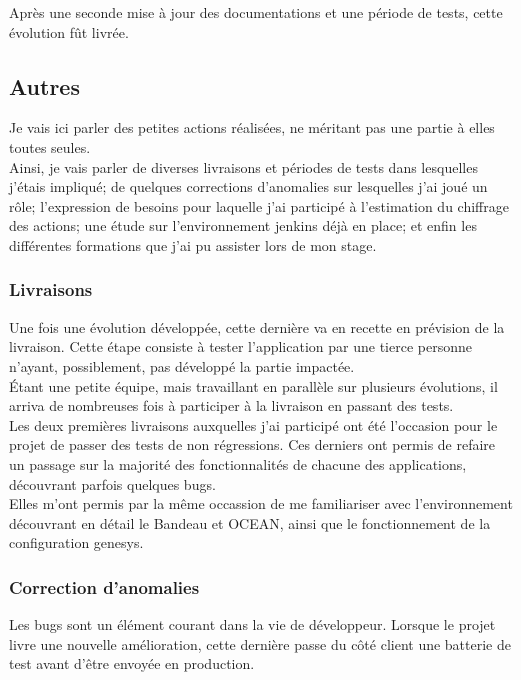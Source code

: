 \documentclass{rapport}
\begin{document}
Après une seconde mise à jour des documentations et une période de tests, cette évolution fût livrée.\\

\newpage
\subsection{Autres}
Je vais ici parler des petites actions réalisées, ne méritant pas une partie à elles toutes seules.\\
Ainsi, je vais parler de diverses livraisons et périodes de tests dans lesquelles j'étais impliqué; de quelques corrections d'anomalies sur lesquelles j'ai joué un rôle; l'expression de besoins pour laquelle j'ai participé à l'estimation du chiffrage des actions; une étude sur l'environnement jenkins déjà en place; et enfin les différentes formations que j'ai pu assister lors de mon stage.

\subsubsection{Livraisons}

Une fois une évolution développée, cette dernière va en recette en prévision de la livraison. Cette étape consiste à tester l'application par une tierce personne n'ayant, possiblement, pas développé la partie impactée.\\
Étant une petite équipe, mais travaillant en parallèle sur plusieurs évolutions, il arriva de nombreuses fois à participer à la livraison en passant des tests.\\

Les deux premières livraisons auxquelles j'ai participé ont été l'occasion pour le projet de passer des tests de non régressions. Ces derniers ont permis de refaire un passage sur la majorité des fonctionnalités de chacune des applications, découvrant parfois quelques bugs. \\
Elles m'ont permis par la même occassion de me familiariser avec l'environnement découvrant en détail le Bandeau et OCEAN, ainsi que le fonctionnement de la configuration genesys.

\subsubsection{Correction d'anomalies}

Les bugs sont un élément courant dans la vie de développeur. Lorsque le projet livre une nouvelle amélioration, cette dernière passe du côté client une batterie de test avant d'être envoyée en production.\\
\end{document}
